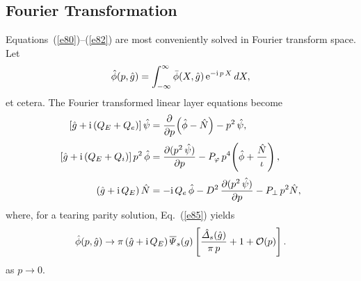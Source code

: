 \documentclass[12pt,prb,aps]{revtex4-1}
\begin{document}
\subsection{Fourier Transformation}
Equations~(\ref{e80})--(\ref{e82}) are most conveniently solved in Fourier transform space.\cite{err2} 
Let
\begin{equation}\label{e86a}
\hat{\phi}(p,\hat{g}) = \int_{-\infty}^\infty \bar{\phi}(X,\hat{g})\,{\rm e}^{-{\rm i}\,p\,X}\,dX,
\end{equation}
et cetera. The Fourier transformed linear layer equations become
\begin{align}\label{e314}
[\hat{g}+{\rm i}\,(Q_E+Q_{e})]\,\hat{\psi}&=\frac{\partial}{\partial p}\!\left(\hat{\phi}-\hat{N}\right)-p^2\,\hat{\psi},\\[0.5ex]
[\hat{g}+{\rm i}\,(Q_E +Q_{i})]\,p^2\,\hat{\phi}&=  \frac{\partial (p^2\,\hat{\psi})}{\partial p}- P_\varphi\,p^4\!\left(\hat{\phi} + \frac{\hat{N}}{\iota}\right),\\[0.5ex]
(\hat{g}+{\rm i}\,Q_E)\,\hat{N} &= - {\rm i}\,Q_{e}\,\hat{\phi} -D^{2}\,\frac{\partial (p^2\,\hat{\psi})}{\partial p}
  - P_\perp\,p^2\hat{N},\label{e316}
\end{align}
where, for a tearing parity solution, Eq.~(\ref{e85}) yields\,\cite{ed}
\begin{equation}\label{e94}
\hat{\phi}(p,\hat{g})\rightarrow \pi\,(\hat{g}+{\rm i}\,Q_E)\,\overline{\mit\Psi}_s(g)\left[\frac{\hat{\mit\Delta}_s(\hat{g})}{\pi\,p} + 1+ {\cal O}(p)\right].
\end{equation}
as $p\rightarrow 0$. 
\end{document}
